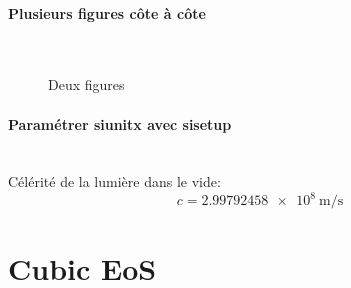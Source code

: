 			\paragraph{Plusieurs figures côte à côte}~~\\

				\lipsum[66]


				\begin{figure}
					\centering
					\caption{Deux figures}
					\label{fig:deux_figures}
				\end{figure}

			\paragraph{Paramétrer siunitx avec sisetup}~~\\
			
        		Célérité de la lumière dans le vide: $$c=\SI{2.99792458e8}{\meter\per\second}$$
\section{Cubic EoS}
